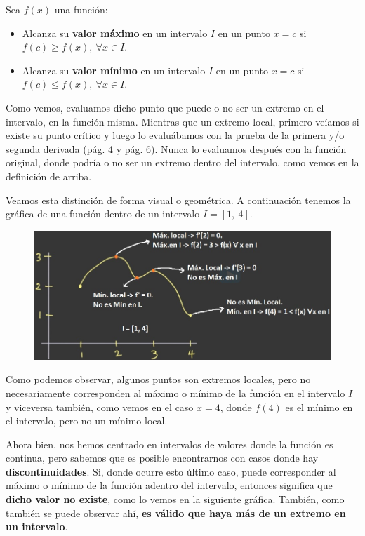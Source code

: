 \documentclass[12pt]{article}
\begin{document}
Sea $f(x)$ una función:

\begin{itemize}
\item Alcanza su \textbf{valor máximo} en un intervalo $I$ en un punto $x = c$ si $f(c) \geq f(x), \ \forall x \in I$.

\item Alcanza su \textbf{valor mínimo} en un intervalo $I$ en un punto $x = c$ si $f(c) \leq f(x), \ \forall x \in I$.
\end{itemize}

Como vemos, evaluamos dicho punto que puede o no ser un extremo en el intervalo, en la función misma. Mientras que un extremo local, primero veíamos si existe su punto crítico y luego lo evaluábamos con la prueba de la primera y/o segunda derivada (pág. 4 y pág. 6). Nunca lo evaluamos después con la función original, donde podría o no ser un extremo dentro del intervalo, como vemos en la definición de arriba.

Veamos esta distinción de forma visual o geométrica. A continuación tenemos la gráfica de una función dentro de un intervalo $I = [1, \ 4]$.

\begin{figure}[hbt!]
\centering
\includegraphics[scale=0.6]{img/min-max-interval.jpg}
\end{figure}

Como podemos observar, algunos puntos son extremos locales, pero no necesariamente corresponden al máximo o mínimo de la función en el intervalo $I$ y viceversa también, como vemos en el caso $x = 4$, donde $f(4)$ es el mínimo en el intervalo, pero no un mínimo local.

Ahora bien, nos hemos centrado en intervalos de valores donde la función es continua, pero sabemos que es posible encontrarnos con casos donde hay \textbf{discontinuidades}. Si, donde ocurre esto último caso, puede corresponder al máximo o mínimo de la función adentro del intervalo, entonces significa que \textbf{dicho valor no existe}, como lo vemos en la siguiente gráfica. También, como también se puede observar ahí, \textbf{es válido que haya más de un extremo en un intervalo}.
\end{document}
